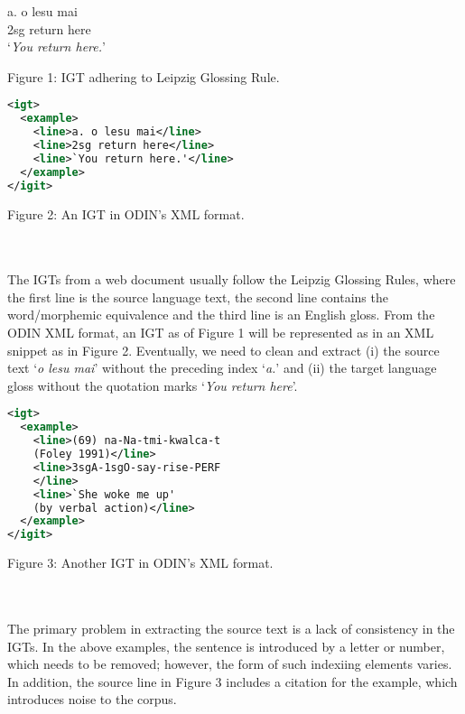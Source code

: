 \documentclass[11pt]{article}
\begin{document}
\begin{minipage}{\columnwidth}

a. \quad o lesu mai \\
\indent \qquad 2sg return here \\
\indent \qquad `\emph{You return here.}' \\

\centerline{Figure 1: IGT adhering to Leipzig Glossing Rule.}
\end{minipage}

\begin{minipage}{\columnwidth}
\begin{lstlisting}[language=XML]
<igt>
  <example>
    <line>a. o lesu mai</line>
    <line>2sg return here</line>
    <line>`You return here.'</line>
  </example>
</igit>
\end{lstlisting} 
\centerline{Figure 2: An IGT in ODIN's XML format.}
\end{minipage}
\\ \\
\noindent The IGTs from a web document usually follow the Leipzig Glossing Rules, where the first line is the source language text, the second line contains the word/morphemic equivalence and the third line is an English gloss. From the ODIN XML format, an IGT as of Figure 1 will be represented as in an XML snippet as in Figure 2. Eventually, we need to clean and extract (i) the source text `\emph{o lesu mai}' without the preceding index `\emph{a.}' and (ii) the target language gloss without the quotation marks `\emph{You return here}'.
\begin{minipage}{\columnwidth}
\begin{lstlisting}[language=XML]
<igt>
  <example>
    <line>(69) na-Na-tmi-kwalca-t 
    (Foley 1991)</line>
    <line>3sgA-1sgO-say-rise-PERF
    </line>
    <line>`She woke me up' 
    (by verbal action)</line>
  </example>
</igit>
\end{lstlisting} 
\smallskip
\centerline{Figure 3: Another IGT in ODIN's XML format.}
\end{minipage}
\\ \\
\noindent The primary problem in extracting the source text is a lack of consistency in the IGTs. In the above examples, the sentence is introduced by a letter or number, which needs to be removed; however, the form of such indexiing elements varies. In addition, the source line in Figure 3 includes a citation for the example, which introduces noise to the corpus.
\end{document}
